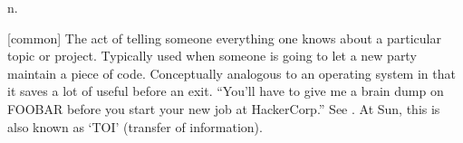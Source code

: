  n.

[common] The act of telling someone everything one knows about a particular
topic or project. Typically used when someone is going to let a new party
maintain a piece of code. Conceptually analogous to an operating system
 in that it saves a lot of useful  before
an exit. ``You'll have to give me a brain dump on FOOBAR before you start your
new job at HackerCorp.'' See . At Sun, this is also
known as `TOI' (transfer of information).

